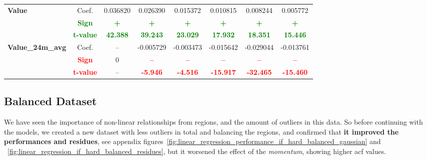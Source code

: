 \documentclass[11pt,english,a4paper,hidelinks]{book}
\begin{document}
\begin{table}[H]
\begin{tabular}{lccccccc}
        \midrule
        \multirow{3}{*}{\textbf{Value}}
            & Coef.   & 0.036820  & 0.026390  & 0.015372  & 0.010815  & 0.008244  & 0.005772  \\
            & \textbf{\textcolor{green}{Sign}}    & \textbf{\textcolor{green}{+}}         & \textbf{\textcolor{green}{+}}         & \textbf{\textcolor{green}{+}}         & \textbf{\textcolor{green}{+}}         & \textbf{\textcolor{green}{+}}         & \textbf{\textcolor{green}{+}}         \\
            & \textbf{\textcolor{green}{t-value}} & \textbf{\textcolor{green}{42.388}}    & \textbf{\textcolor{green}{39.243}}    & \textbf{\textcolor{green}{23.029}}    & \textbf{\textcolor{green}{17.932}}    & \textbf{\textcolor{green}{18.351}}    & \textbf{\textcolor{green}{15.446}}    \\
        \multirow{3}{*}{\textbf{Value\_24m\_avg}} 
            & Coef.   & -- & -0.005729 & -0.003473 & -0.015642 & -0.029044 & -0.013761 \\
            & \textbf{\textcolor{red}{Sign}}    & 0  & \textbf{\textcolor{red}{–}}         & \textbf{\textcolor{red}{–}}         & \textbf{\textcolor{red}{–}}         & \textbf{\textcolor{red}{–}}         & \textbf{\textcolor{red}{–}}         \\
            & \textbf{\textcolor{red}{t-value}} & -- & \textbf{\textcolor{red}{-5.946}}    & \textbf{\textcolor{red}{-4.516}}    & \textbf{\textcolor{red}{-15.917}}   & \textbf{\textcolor{red}{-32.465}}   & \textbf{\textcolor{red}{-15.460}}   \\
        \bottomrule
    \end{tabular}
    \label{tab:africa_middle_east_windowed_consistency_summary}
\end{table}

\subsection{Balanced Dataset}

We have seen the importance of non-linear relationships from regions, and the amount of outliers in this data. So before continuing with the models, we created a new dataset with less outliers in total and balancing the regions, and confirmed that \textbf{it improved the performances and residues}, see appendix figures~\ref{fig:linear_regression_performance_if_hard_balanced_gaussian} and ~\ref{fig:linear_regression_if_hard_balanced_residues}, but it worsened the effect of the \textit{momentum}, showing higher \acrshort{acf} values.
\end{document}
